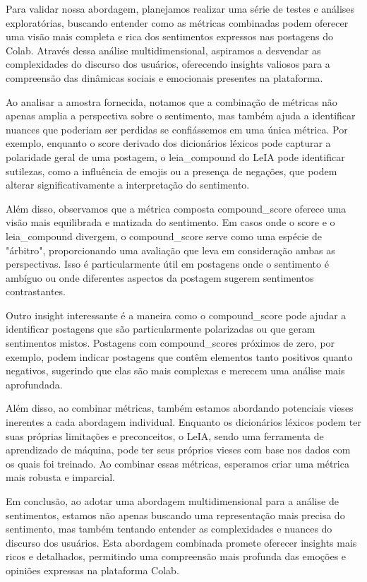Para validar nossa abordagem, planejamos realizar uma série de testes e análises exploratórias, buscando entender como as métricas combinadas podem oferecer uma visão mais completa e rica dos sentimentos expressos nas postagens do Colab. Através dessa análise multidimensional, aspiramos a desvendar as complexidades do discurso dos usuários, oferecendo insights valiosos para a compreensão das dinâmicas sociais e emocionais presentes na plataforma.

Ao analisar a amostra fornecida, notamos que a combinação de métricas não apenas amplia a perspectiva sobre o sentimento, mas também ajuda a identificar nuances que poderiam ser perdidas se confiássemos em uma única métrica. Por exemplo, enquanto o score derivado dos dicionários léxicos pode capturar a polaridade geral de uma postagem, o leia\_compound do LeIA pode identificar sutilezas, como a influência de emojis ou a presença de negações, que podem alterar significativamente a interpretação do sentimento.

Além disso, observamos que a métrica composta compound\_score oferece uma visão mais equilibrada e matizada do sentimento. Em casos onde o score e o leia\_compound divergem, o compound\_score serve como uma espécie de "árbitro", proporcionando uma avaliação que leva em consideração ambas as perspectivas. Isso é particularmente útil em postagens onde o sentimento é ambíguo ou onde diferentes aspectos da postagem sugerem sentimentos contrastantes.

Outro insight interessante é a maneira como o compound\_score pode ajudar a identificar postagens que são particularmente polarizadas ou que geram sentimentos mistos. Postagens com compound\_scores próximos de zero, por exemplo, podem indicar postagens que contêm elementos tanto positivos quanto negativos, sugerindo que elas são mais complexas e merecem uma análise mais aprofundada.

Além disso, ao combinar métricas, também estamos abordando potenciais vieses inerentes a cada abordagem individual. Enquanto os dicionários léxicos podem ter suas próprias limitações e preconceitos, o LeIA, sendo uma ferramenta de aprendizado de máquina, pode ter seus próprios vieses com base nos dados com os quais foi treinado. Ao combinar essas métricas, esperamos criar uma métrica mais robusta e imparcial.

Em conclusão, ao adotar uma abordagem multidimensional para a análise de sentimentos, estamos não apenas buscando uma representação mais precisa do sentimento, mas também tentando entender as complexidades e nuances do discurso dos usuários. Esta abordagem combinada promete oferecer insights mais ricos e detalhados, permitindo uma compreensão mais profunda das emoções e opiniões expressas na plataforma Colab.

